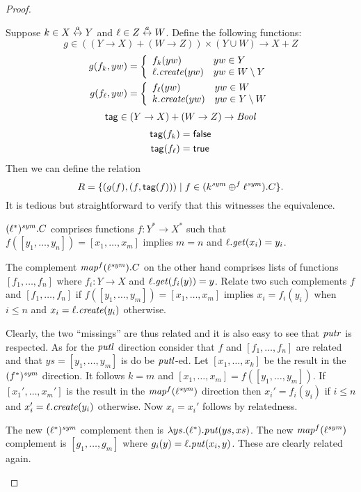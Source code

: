 \begin{defn}[$R$-similarity]
\begin{theorem}
\begin{lemma}
\begin{theorem}[No products]
\begin{lemma}
\begin{defn}
\begin{theorem}
\begin{corollary}[Hylomorphism]
\begin{defn}
\begin{defn}[Symmetrization]
\begin{proof}
\begin{longenum}
\item Suppose $k \in X \overset{a}{\leftrightarrow} Y$ and $\ell \in Z \overset{a}{\leftrightarrow} W$.  Define the
following functions:
\[g \in ((Y \to X) + (W \to Z)) \times (Y \cup W) \to X + Z\]
\begin{align*}
    g( f_k,yw) &= \left\{\begin{array}{ll}
         f_k(yw) & yw \in Y \\
         \ell.\mathit{create}(yw) & yw \in W \setminus Y
        \end{array}\right. \\
    g( f_\ell,yw) &= \left\{\begin{array}{ll}
         f_\ell(yw) & yw \in W \\
         k.\mathit{create}(yw) & yw \in Y \setminus W
        \end{array}\right.
\end{align*}
\[\mathsf{tag} \in (Y \to X) + (W \to Z) \to \mathit{Bool}\]
\begin{align*}
    \mathsf{tag}( f_k) &= \mathsf{false} \\
    \mathsf{tag}( f_\ell) &= \mathsf{true}
\end{align*}
Then we can define the relation
\[R = \{(g(f),(f,\mathsf{tag}(f))) \mid f \in (k^\mathit{sym} \oplus^f \ell^\mathit{sym}).C\}.\]
It is tedious but straightforward to verify that this witnesses the
equivalence.
\item $(\ell^*)^\mathit{sym}.C$ comprises functions $f:Y^*\to X^*$ such that 
$f([y_1,\dots,y_n])=[x_1,\dots,x_m]$ implies $m=n$ and $\ell.\mathit{get}(x_i)=y_i$. 

The complement $\mathit{map}^f(\ell^\mathit{sym}).C$ on the other hand comprises lists
of functions $[f_1,\dots,f_n]$ where $f_i:Y\to X$ and
$\ell.\mathit{get}(f_i(y))=y$. Relate two such complements $f$ and
$[f_1,\dots,f_n]$ if $f([y_1,\dots,y_m])=[x_1,\dots,x_m]$ implies
$x_i=f_i(y_i)$ when $i\leq n$ and $x_i=\ell.\mathit{create}(y_i)$ otherwise. 

Clearly, the two ``missings'' are thus related and it is also easy to see
that $\mathit{putr}$ is respected. As for the $\mathit{putl}$ direction consider that
$f$ and $[f_1,\dots,f_n]$ are related and that $ys=[y_1,\dots,y_m]$ is
do be $\mathit{putl}$-ed. Let $[x_1,\dots,x_k]$ be the result in the
$(f^*)^\mathit{sym}$ direction. It follows $k=m$ and
$[x_1,\dots,x_m]=f([y_1,\dots,y_m])$. If $[x_1',\dots,x_m']$ is the
 result in the
$\mathit{map}^f(\ell^\mathit{sym})$ direction then $x_i'=f_i(y_i)$ if $i\leq n$ and
$x_i'=\ell.\mathit{create}(y_i)$ otherwise. Now $x_i=x_i'$  follows by
relatedness. 

The new $(\ell^*)^\mathit{sym}$ complement then is $\lambda
ys.(\ell^*).\mathit{put}(ys,xs)$. The new $\mathit{map}^f(\ell^\mathit{sym})$ complement is
$[g_1,\dots,g_m]$ where $g_i(y)=\ell.\mathit{put}(x_i,y)$. These are clearly
related again. 
\endofpf
\end{longenum}
\end{proof}
\fi


\end{defn}
\end{defn}
\end{corollary}
\end{theorem}
\end{defn}
\end{lemma}
\end{theorem}
\end{lemma}
\end{theorem}
\end{defn}
